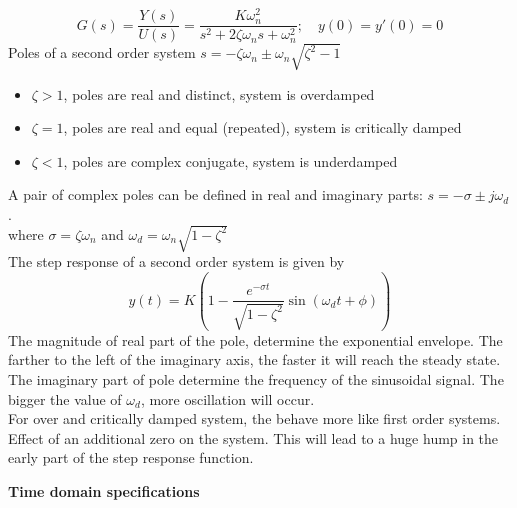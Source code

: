 \begin{enumerate}
    \[G(s) = \frac{Y(s)}{U(s)} = \frac{K \omega_n^2}{s^2 + 2 \zeta \omega_n s + \omega_n^2}; \quad y(0)=y'(0)=0\]
    Poles of a second order system $\displaystyle s = -\zeta \omega_n \pm \omega_n \sqrt{\zeta^2 -1}$
    \begin{itemize}
        \item $\zeta > 1$, poles are real and distinct, system is overdamped
        \item $\zeta = 1$, poles are real and equal (repeated), system is critically damped
        \item $\zeta < 1$, poles are complex conjugate, system is underdamped
    \end{itemize}
    A pair of complex poles can be defined in real and imaginary parts: $s = -\sigma \pm j\omega_d$. \\
    where $\sigma = \zeta \omega_n$ and $\omega_d = \omega_n \sqrt{1-\zeta^2}$ \\
    The step response of a second order system is given by
    \[y(t) = K \left( 1 - \frac{e^{-\sigma t}}{\sqrt{1 - \zeta^2}} \sin(\omega_d t + \phi) \right)\]
    The magnitude of real part of the pole, determine the exponential envelope. The farther to the left of the imaginary axis, the faster it will reach the steady state.\\
    The imaginary part of pole determine the frequency of the sinusoidal signal. The bigger the value of $\omega_d$, more oscillation will occur.\\
    For over and critically damped system, the behave more like first order systems. \\
    Effect of an additional zero on the system. This will lead to a huge hump in the early part of the step response function.    
\end{enumerate}
\textbf{Time domain specifications}

